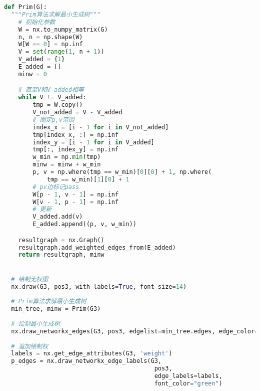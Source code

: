 \documentclass[withoutpreface]{cumcmthesis}
\begin{document}
  \begin{lstlisting}[language=python ,caption={Prim算法} ]
  def Prim(G):
  """Prim算法求解最小生成树"""
    # 初始化参数
    W = nx.to_numpy_matrix(G)
    n, n = np.shape(W)
    W[W == 0] = np.inf
    V = set(range(1, n + 1))
    V_added = {1}
    E_added = []
    minw = 0

    # 直至V和V_added相等
    while V != V_added:
        tmp = W.copy()
        V_not_added = V - V_added
        # 圈定p,v范围
        index_x = [i - 1 for i in V_not_added]
        tmp[index_x, :] = np.inf
        index_y = [i - 1 for i in V_added]
        tmp[:, index_y] = np.inf
        w_min = np.min(tmp)
        minw = minw + w_min
        p, v = np.where(tmp == w_min)[0][0] + 1, np.where(
            tmp == w_min)[1][0] + 1
        # pv边标记pass
        W[p - 1, v - 1] = np.inf
        W[v - 1, p - 1] = np.inf
        # 更新
        V_added.add(v)
        E_added.append((p, v, w_min))

    resultgraph = nx.Graph()
    resultgraph.add_weighted_edges_from(E_added)
    return resultgraph, minw


  # 绘制无权图
  nx.draw(G3, pos3, with_labels=True, font_size=14)
  
  # Prim算法求解最小生成树
  min_tree, minw = Prim(G3)
  
  # 绘制最小生成树
  nx.draw_networkx_edges(G3, pos3, edgelist=min_tree.edges, edge_color="red", width=3)
  
  # 追加绘制权
  labels = nx.get_edge_attributes(G3, 'weight')
  p_edges = nx.draw_networkx_edge_labels(G3,
                                          pos3,
                                          edge_labels=labels,
                                          font_color="green")
  \end{lstlisting}
\end{document}
